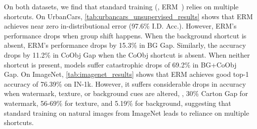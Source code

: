 \documentclass[10pt,twocolumn,letterpaper]{article}
\begin{document}
On both datasets, we find that standard training (\ie, ERM~\cite{vapnik1999Nature}) relies on multiple shortcuts.
On UrbanCars, \cref{tab:urbancars_unsupervised_results} shows that ERM achieves near zero in-distributional error (97.6\% I.D. Acc.).
However, ERM's performance drops when group shift happens.
When the background shortcut is absent, ERM's performance drops by 15.3\% in BG Gap.
Similarly, the accuracy drops by 11.2\% in CoObj Gap when the CoObj shortcut is absent.
When neither shortcut is present, models suffer catastrophic drops of 69.2\% in BG+CoObj Gap.
On ImageNet, \cref{tab:imagenet_results} shows that ERM achieves good top-1 accuracy of 76.39\% on IN-1k.
However, it suffers considerable drops in accuracy when watermark, texture, or background cues are altered, \eg, 30\% Carton Gap for watermark, 56-69\% for texture, and 5.19\% for background, suggesting that standard training on natural images from ImageNet leads to reliance on multiple shortcuts.
\end{document}
